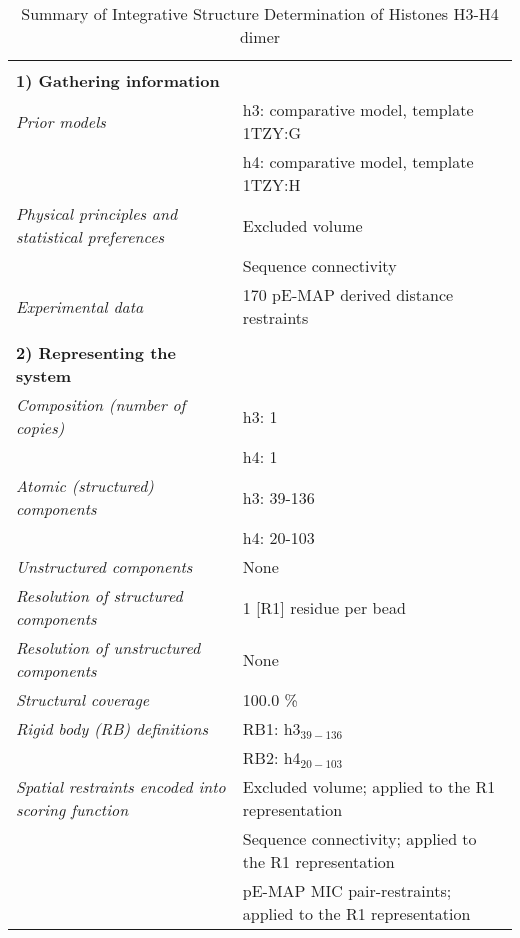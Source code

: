 \documentclass[8pt,a4paper]{article}
\begin{document}
\setcounter{table}{2}

\begin{longtable}{ p{} | p{} } 
\caption{Summary of Integrative Structure Determination of Histones H3-H4 dimer}
  
  &  \\
  \textbf{1) Gathering information} & \\
    \hline

            \textit{Prior models} & h3: comparative model, template 1TZY:G\\
            & h4: comparative model, template 1TZY:H \\
                \textit{Physical principles and statistical preferences} & Excluded volume\\
            & Sequence connectivity \\
                \textit{Experimental data} & 170 pE-MAP derived distance restraints\\
          
    &  \\
    \normalsize{\textbf{2) Representing the system}} & \\
    \hline
    
            \textit{Composition (number of copies)} & h3: 1\\
            & h4: 1 \\
                \textit{Atomic (structured) components} & h3: 39-136\\
            & h4: 20-103 \\
                \textit{Unstructured components} & None\\
                \textit{Resolution of structured components} & 1 [R1] residue per bead\\
                \textit{Resolution of unstructured components} & None\\
                \textit{Structural coverage} & 100.0 \%\\
                \textit{Rigid body (RB) definitions} & RB1: h3$_{39-136}$\\
            & RB2: h4$_{20-103}$ \\
                \textit{Spatial restraints encoded into scoring function} & Excluded volume; applied to the R1 representation\\
            & Sequence connectivity; applied to the R1 representation \\
            & pE-MAP MIC pair-restraints; applied to the R1 representation \\
        


\end{longtable}
\end{document}
